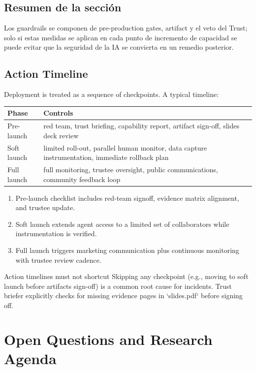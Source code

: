 \documentclass[a4paper]{article}
\begin{document}
\subsection{Resumen de la sección}

Los guardrails se componen de pre-production gates, artifact y el veto del Trust; solo si estas medidas se aplican en cada punto de incremento de capacidad se puede evitar que la seguridad de la IA se convierta en un remedio posterior.

\subsection{Action Timeline}

Deployment is treated as a sequence of checkpoints. A typical timeline:

\begin{tabular}{p{}p{}}
\toprule
Phase & Controls \\
\midrule
Pre-launch & red team, trust briefing, capability report, artifact sign-off, slides deck review \\
Soft launch & limited roll-out, parallel human monitor, data capture instrumentation, immediate rollback plan \\
Full launch & full monitoring, trustee oversight, public communications, community feedback loop \\
\bottomrule
\end{tabular}

\begin{enumerate}
    \item Pre-launch checklist includes red-team signoff, evidence matrix alignment, and trustee update.
    \item Soft launch extends agent access to a limited set of collaborators while instrumentation is verified.
    \item Full launch triggers marketing communication plus continuous monitoring with trustee review cadence.
\end{enumerate}

\begin{warningbox}{Action timelines must not shortcut}
Skipping any checkpoint (e.g., moving to soft launch before artifacts sign-off) is a common root cause for incidents. Trust briefer explicitly checks for missing evidence pages in `slides.pdf` before signing off.
\end{warningbox}

\section{Open Questions and Research Agenda}
\end{document}
